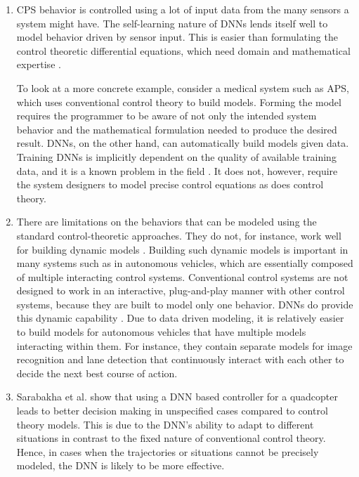 \begin{enumerate}
	\item CPS behavior is controlled using a lot of input data from the many sensors a system might have. The self-learning nature of DNNs lends itself well to model behavior driven by sensor input. This is easier than formulating the control theoretic differential equations, which need domain and mathematical expertise \cite{Aamir_2013}.
	
	
	To look at a more concrete example, consider a medical system such as \ac{APS}, which uses conventional control theory to build models. 
	Forming the model requires the programmer to be aware of not only the intended system behavior and the mathematical formulation needed to produce the desired result. 
	DNNs, on the other hand, can automatically build models given data.
	Training DNNs is implicitly dependent on the quality of available training data, and it is a known problem in the field \cite{jabbar2015methods}. It does not, however, require the system designers to model precise control equations as does control theory.
	\item  There are limitations on the behaviors that can be modeled using the standard control-theoretic approaches. They do not, for instance, work well for building dynamic models \cite{article23}. Building such dynamic models is important in many systems such as in autonomous vehicles, which are essentially composed of multiple interacting control systems. Conventional control systems are not designed to work in an interactive, plug-and-play manner with other control systems, because they are built to model only one behavior. DNNs do provide this dynamic capability \cite{article23}. 
	Due to data driven modeling, it is relatively easier to build models for autonomous vehicles that have multiple models interacting within them.
	For instance, they contain separate models for image recognition and lane detection that continuously interact with each other to decide the next best course of action.
	
	\item Sarabakha et al. \cite{sarabakha2019online} show that using a \ac{DNN} based controller for a quadcopter leads to better decision making in unspecified cases compared to control theory models.
	This is due to the \ac{DNN}'s ability to adapt to different situations in contrast to the fixed nature of conventional control theory. 
	Hence, in cases when the trajectories or situations cannot be precisely modeled, the \ac{DNN} is likely to be more effective. 
\end{enumerate}





